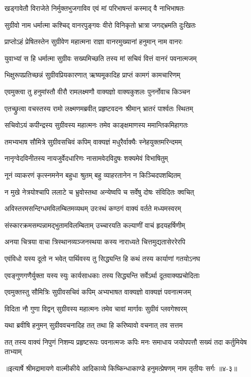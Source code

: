 \twolineshloka
{खड्गावेतौ विराजेते निर्मुक्तभुजगाविव}
{एवं मां परिभाषन्तं कस्माद् वै नाभिभाषतः} %

\twolineshloka
{सुग्रीवो नाम धर्मात्मा कश्चिद् वानरपुङ्गवः}
{वीरो विनिकृतो भ्रात्रा जगद्भ्रमति दुःखितः} %

\twolineshloka
{प्राप्तोऽहं प्रेषितस्तेन सुग्रीवेण महात्मना}
{राज्ञा वानरमुख्यानां हनुमान् नाम वानरः} %

\twolineshloka
{युवाभ्यां स हि धर्मात्मा सुग्रीवः सख्यमिच्छति}
{तस्य मां सचिवं वित्तं वानरं पवनात्मजम्} %

\twolineshloka
{भिक्षुरूपप्रतिच्छन्नं सुग्रीवप्रियकारणात्}
{ऋष्यमूकादिह प्राप्तं कामगं कामचारिणम्} %

\twolineshloka
{एवमुक्त्वा तु हनुमांस्तौ वीरौ रामलक्ष्मणौ}
{वाक्यज्ञो वाक्यकुशलः पुनर्नोवाच किञ्चन} %

\twolineshloka
{एतच्छ्रुत्वा वचस्तस्य रामो लक्ष्मणमब्रवीत्}
{प्रहृष्टवदनः श्रीमान् भ्रातरं पार्श्वतः स्थितम्} %

\twolineshloka
{सचिवोऽयं कपीन्द्रस्य सुग्रीवस्य महात्मनः}
{तमेव काङ्क्षमाणस्य ममान्तिकमिहागतः} %

\twolineshloka
{तमभ्यभाष सौमित्रे सुग्रीवसचिवं कपिम्}
{वाक्यज्ञं मधुरैर्वाक्यैः स्नेहयुक्तमरिन्दमम्} %

\twolineshloka
{नानृग्वेदविनीतस्य नायजुर्वेदधारिणः}
{नासामवेदविदुषः शक्यमेवं विभाषितुम्} %

\twolineshloka
{नूनं व्याकरणं कृत्स्नमनेन बहुधा श्रुतम्}
{बहु व्याहरतानेन न किञ्चिदपशब्दितम्} %

\twolineshloka
{न मुखे नेत्रयोश्चापि ललाटे च भ्रुवोस्तथा}
{अन्येष्वपि च सर्वेषु दोषः संविदितः क्वचित्} %

\twolineshloka
{अविस्तरमसन्दिग्धमविलम्बितमव्यथम्}
{उरःस्थं कण्ठगं वाक्यं वर्तते मध्यमस्वरम्} %

\twolineshloka
{संस्कारक्रमसम्पन्नामद्भुतामविलम्बिताम्}
{उच्चारयति कल्याणीं वाचं हृदयहर्षिणीम्} %

\twolineshloka
{अनया चित्रया वाचा त्रिस्थानव्यञ्जनस्थया}
{कस्य नाराध्यते चित्तमुद्यतासेररेरपि} %

\twolineshloka
{एवंविधो यस्य दूतो न भवेत् पार्थिवस्य तु}
{सिद्ध्यन्ति हि कथं तस्य कार्याणां गतयोऽनघ} %

\twolineshloka
{एवङ्गुणगणैर्युक्ता यस्य स्युः कार्यसाधकाः}
{तस्य सिद्ध्यन्ति सर्वेऽर्था दूतवाक्यप्रचोदिताः} %

\twolineshloka
{एवमुक्तस्तु सौमित्रिः सुग्रीवसचिवं कपिम्}
{अभ्यभाषत वाक्यज्ञो वाक्यज्ञं पवनात्मजम्} %

\twolineshloka
{विदिता नौ गुणा विद्वन् सुग्रीवस्य महात्मनः}
{तमेव चावां मार्गावः सुग्रीवं प्लवगेश्वरम्} %

\twolineshloka
{यथा ब्रवीषि हनुमन् सुग्रीववचनादिह}
{तत् तथा हि करिष्यावो वचनात् तव सत्तम} %

\twolineshloka
{तत् तस्य वाक्यं निपुणं निशम्य प्रहृष्टरूपः पवनात्मजः कपिः}
{मनः समाधाय जयोपपत्तौ सख्यं तदा कर्तुमियेष ताभ्याम्} %


॥इत्यार्षे श्रीमद्रामायणे वाल्मीकीये आदिकाव्ये किष्किन्धाकाण्डे हनुमत्प्रेषणम् नाम तृतीयः सर्गः ॥४-३॥
